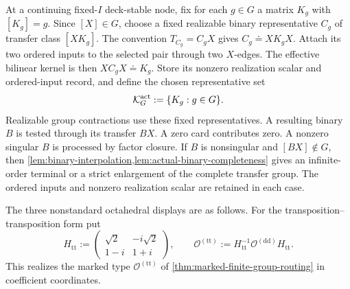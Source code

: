 \documentclass[11pt,letterpaper,onecolumn]{article}
\theoremstyle{plain}
\theoremstyle{definition}
\theoremstyle{remark}
\newcommand{\OctDD}{{\mathcal O^{(\mathrm{dd})}}}
\newcommand{\OctTT}{{\mathcal O^{(\mathrm{tt})}}}
\begin{document}
At a continuing fixed-\(I\) deck-stable node, fix for each \(g\in G\)
a matrix \(K_g\) with \([K_g]=g\).  Since \([X]\in G\), choose a fixed
realizable binary representative \(C_g\) of transfer class \([XK_g]\).
The convention \(T_{C_g}=C_gX\) gives \(C_g\doteq XK_gX\).
Attach its two ordered inputs to the selected pair through two \(X\)-edges. The effective bilinear kernel is then
\(XC_gX\doteq K_g\).  Store its nonzero realization
scalar and ordered-input record, and define the chosen representative set
\begin{equation}
  \mathcal K_G^{\rm act}:=\{K_g:g\in G\}.
  \label{eq:platonic-actual-kernel-lift}
\end{equation}
Realizable group contractions use these fixed representatives.  A resulting
binary \(B\) is tested through its transfer \(BX\).  A zero card contributes
zero. A nonzero singular \(B\) is processed by factor closure.  If
\(B\) is nonsingular and \([BX]\notin G\), then
\cref{lem:binary-interpolation,lem:actual-binary-completeness} gives an
infinite-order terminal or a strict enlargement of the complete transfer group.
The ordered inputs and nonzero realization scalar are retained in each
case.


The three nonstandard octahedral displays are as follows.  For the
transposition--transposition form put
\begin{equation}
 H_{\mathrm{tt}}:=
 \begin{pmatrix}\sqrt2&-i\sqrt2\\1-i&1+i\end{pmatrix},
 \qquad
 \OctTT:=H_{\mathrm{tt}}^{-1}\OctDD H_{\mathrm{tt}}.
 \label{eq:octahedral-second-form}
\end{equation}
This realizes the marked type \(\OctTT\) of
\cref{thm:marked-finite-group-routing} in coefficient coordinates.
\end{document}
